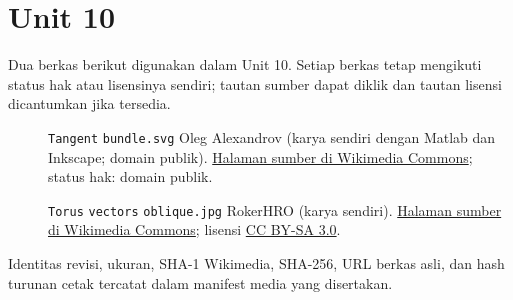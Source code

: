 \section*{Unit 10}
Dua berkas berikut digunakan dalam Unit 10. Setiap berkas tetap mengikuti status hak atau lisensinya sendiri; tautan sumber dapat diklik dan tautan lisensi dicantumkan jika tersedia.
\begin{description}
\item[]\texttt{Tangent} \texttt{bundle.svg}
Oleg Alexandrov (karya sendiri dengan Matlab dan Inkscape; domain publik).
\href{https://commons.wikimedia.org/wiki/File:Tangent_bundle.svg}{Halaman sumber di Wikimedia Commons}; status hak: domain publik.
\item[]\texttt{Torus} \texttt{vectors} \texttt{oblique.jpg}
RokerHRO (karya sendiri).
\href{https://commons.wikimedia.org/wiki/File:Torus_vectors_oblique.jpg}{Halaman sumber di Wikimedia Commons}; lisensi \href{https://creativecommons.org/licenses/by-sa/3.0/}{CC BY-SA 3.0}.
\end{description}
Identitas revisi, ukuran, SHA-1 Wikimedia, SHA-256, URL berkas asli, dan hash turunan cetak tercatat dalam manifest media yang disertakan.
